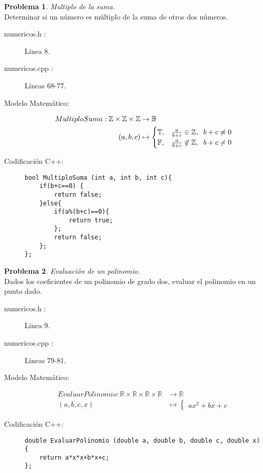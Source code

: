 \documentclass{article}
\theoremstyle{plain}
\theoremstyle{definition}
\newtheorem{problem}{Problema}
\begin{document}
\begin{problem} \emph{Multiplo de la suma.}\\
\hspace*{7mm}Determinar si un número es múltiplo de la suma de otros dos números.
%
\begin{description}
\item[numericos.h :] Linea 8. \item[numericos.cpp :] Lineas 68-77.

\item[Modelo Matemático:]
\begin{align*}
MultiploSuma: \mathbb{Z}\times\mathbb{Z}\times\mathbb{Z} &\to \mathbb{B}\\
(a,b,c) &\mapsto \begin{cases}
\mathbb{T},& \frac{a}{b+c}\in\mathbb{Z},\hspace*{2mm}b+c\neq 0\\
\mathbb{F},& \frac{a}{b+c}\not\in\mathbb{Z},\hspace*{2mm}b+c\neq 0\\
\end{cases}
\end{align*}
%
\item[Codificación \textsf{C++}:]\hfill
%
\begin{verbatim}
bool MultiploSuma (int a, int b, int c){
    if(b+c==0) {
        return false;
    }else{
        if(a%(b+c)==0){
            return true;
        };
        return false;
    };
};
\end{verbatim}
\end{description}
\end{problem}

\begin{problem} \emph{Evaluación de un polinomio.}\\
\hspace*{7mm}Dados los coeficientes de un polinomio de grado dos, evaluar el polinomio en un punto dado.
%
\begin{description}
\item[numericos.h :] Linea 9. \item[numericos.cpp :] Lineas 79-81.

\item[Modelo Matemático:]
\begin{align*}
EvaluarPolinomio: \mathbb{R}\times\mathbb{R}\times\mathbb{R}\times\mathbb{R} &\to \mathbb{R}\\
(a,b,c,x) &\mapsto \begin{cases}
ax^2+bx+c
\end{cases}
\end{align*}
%
\item[Codificación \textsf{C++}:]\hfill
%
\begin{verbatim}
double EvaluarPolinomio (double a, double b, double c, double x){
    return a*x*x+b*x+c;
};
\end{verbatim}
\end{description}
\end{problem}
\end{document}
